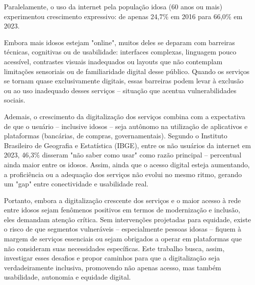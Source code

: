 Paralelamente, o uso da internet pela população idosa (60 anos ou mais) experimentou crescimento expressivo: de apenas 24,7\% em 2016 para 66,0\% em 2023.

Embora mais idosos estejam "online", muitos deles se deparam com barreiras técnicas, cognitivas ou de usabilidade: interfaces complexas, linguagem pouco acessível, contrastes visuais inadequados ou layouts que não contemplam limitações sensoriais ou de familiaridade digital desse público. Quando os serviços se tornam quase exclusivamente digitais, essas barreiras podem levar à exclusão ou ao uso inadequado desses serviços -- situação que acentua vulnerabilidades sociais.

Ademais, o crescimento da digitalização dos serviços combina com a expectativa de que o usuário -- inclusive idosos -- seja autônomo na utilização de aplicativos e plataformas (bancárias, de compras, governamentais). Segundo o Instituto Brasileiro de Geografia e Estatística (IBGE), entre os não usuários da internet em 2023, 46,3\% disseram "não saber como usar" como razão principal -- percentual ainda maior entre os idosos. Assim, ainda que o acesso digital esteja aumentando, a proficiência ou a adequação dos serviços não evolui no mesmo ritmo, gerando um "gap" entre conectividade e usabilidade real.

Portanto, embora a digitalização crescente dos serviços e o maior acesso à rede entre idosos sejam fenômenos positivos em termos de modernização e inclusão, eles demandam atenção crítica. Sem intervenções projetadas para equidade, existe o risco de que segmentos vulneráveis -- especialmente pessoas idosas -- fiquem à margem de serviços essenciais ou sejam obrigados a operar em plataformas que não consideram suas necessidades específicas. Este trabalho busca, assim, investigar esses desafios e propor caminhos para que a digitalização seja verdadeiramente inclusiva, promovendo não apenas acesso, mas também usabilidade, autonomia e equidade digital.



